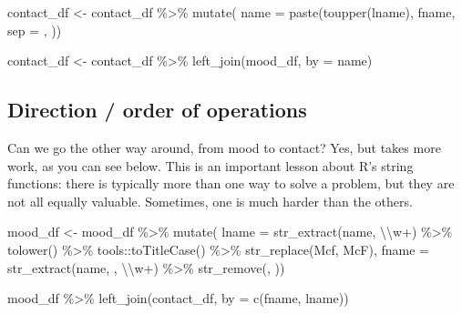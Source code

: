 \documentclass[
]{book}
\newenvironment{Shaded}{\begin{snugshade}}{\end{snugshade}}
\newcommand{\AttributeTok}[1]{\textcolor[rgb]{0.77,0.63,0.00}{#1}}
\newcommand{\FunctionTok}[1]{\textcolor[rgb]{0.00,0.00,0.00}{#1}}
\newcommand{\NormalTok}[1]{#1}
\newcommand{\OtherTok}[1]{\textcolor[rgb]{0.56,0.35,0.01}{#1}}
\newcommand{\SpecialCharTok}[1]{\textcolor[rgb]{0.00,0.00,0.00}{#1}}
\newcommand{\StringTok}[1]{\textcolor[rgb]{0.31,0.60,0.02}{#1}}
\begin{document}
\begin{Shaded}
\begin{Highlighting}[]
\NormalTok{contact\_df }\OtherTok{\textless{}{-}}\NormalTok{ contact\_df }\SpecialCharTok{\%\textgreater{}\%} 
  \FunctionTok{mutate}\NormalTok{(}
    \AttributeTok{name =} \FunctionTok{paste}\NormalTok{(}\FunctionTok{toupper}\NormalTok{(lname), fname, }\AttributeTok{sep =} \StringTok{\textquotesingle{}, \textquotesingle{}}\NormalTok{))}

\NormalTok{contact\_df }\OtherTok{\textless{}{-}}\NormalTok{ contact\_df }\SpecialCharTok{\%\textgreater{}\%} 
  \FunctionTok{left\_join}\NormalTok{(mood\_df, }\AttributeTok{by =} \StringTok{\textquotesingle{}name\textquotesingle{}}\NormalTok{)}
\end{Highlighting}
\end{Shaded}

\hypertarget{direction-order-of-operations}{%
\subsection{Direction / order of operations}\label{direction-order-of-operations}}

Can we go the other way around, from mood to contact? Yes, but takes more work, as you can see below. This is an important lesson about R's string functions: there is typically more than one way to solve a problem, but they are not all equally valuable. Sometimes, one is much harder than the others.

\begin{Shaded}
\begin{Highlighting}[]
\NormalTok{mood\_df }\OtherTok{\textless{}{-}}\NormalTok{ mood\_df }\SpecialCharTok{\%\textgreater{}\%} 
  \FunctionTok{mutate}\NormalTok{(}
    \AttributeTok{lname =} \FunctionTok{str\_extract}\NormalTok{(name, }\StringTok{\textquotesingle{}}\SpecialCharTok{\textbackslash{}\textbackslash{}}\StringTok{w+\textquotesingle{}}\NormalTok{) }\SpecialCharTok{\%\textgreater{}\%} 
      \FunctionTok{tolower}\NormalTok{() }\SpecialCharTok{\%\textgreater{}\%} 
\NormalTok{      tools}\SpecialCharTok{::}\FunctionTok{toTitleCase}\NormalTok{() }\SpecialCharTok{\%\textgreater{}\%} 
      \FunctionTok{str\_replace}\NormalTok{(}\StringTok{\textquotesingle{}Mcf\textquotesingle{}}\NormalTok{, }\StringTok{\textquotesingle{}McF\textquotesingle{}}\NormalTok{),}
    \AttributeTok{fname =} \FunctionTok{str\_extract}\NormalTok{(name, }\StringTok{\textquotesingle{}, }\SpecialCharTok{\textbackslash{}\textbackslash{}}\StringTok{w+\textquotesingle{}}\NormalTok{) }\SpecialCharTok{\%\textgreater{}\%} 
      \FunctionTok{str\_remove}\NormalTok{(}\StringTok{\textquotesingle{}, \textquotesingle{}}\NormalTok{))}

\NormalTok{mood\_df }\SpecialCharTok{\%\textgreater{}\%} 
  \FunctionTok{left\_join}\NormalTok{(contact\_df, }\AttributeTok{by =} \FunctionTok{c}\NormalTok{(}\StringTok{\textquotesingle{}fname\textquotesingle{}}\NormalTok{, }\StringTok{\textquotesingle{}lname\textquotesingle{}}\NormalTok{))}
\end{Highlighting}
\end{Shaded}
\end{document}
